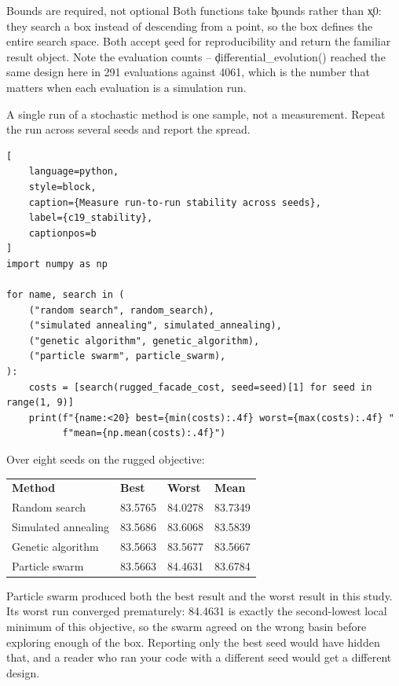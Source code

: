 \begin{SyntaxBox}{Bounds are required, not optional}
Both functions take \c{bounds} rather than \c{x0}: they search a box instead of
descending from a point, so the box defines the entire search space. Both accept
\c{seed} for reproducibility and return the familiar result object. Note the
evaluation counts -- \c{differential_evolution()} reached the same design here
in 291 evaluations against 4061, which is the number that matters when each
evaluation is a simulation run.
\end{SyntaxBox}


A single run of a stochastic method is one sample, not a measurement. Repeat the
run across several seeds and report the spread.

\begin{lstlisting}[
    language=python,
    style=block,
    caption={Measure run-to-run stability across seeds},
    label={c19_stability},
    captionpos=b
]
import numpy as np

for name, search in (
    ("random search", random_search),
    ("simulated annealing", simulated_annealing),
    ("genetic algorithm", genetic_algorithm),
    ("particle swarm", particle_swarm),
):
    costs = [search(rugged_facade_cost, seed=seed)[1] for seed in range(1, 9)]
    print(f"{name:<20} best={min(costs):.4f} worst={max(costs):.4f} "
          f"mean={np.mean(costs):.4f}")
\end{lstlisting}

Over eight seeds on the rugged objective:

\begin{center}
\begin{tabular}{llll}
\textbf{Method} & \textbf{Best} & \textbf{Worst} & \textbf{Mean} \\
Random search & 83.5765 & 84.0278 & 83.7349 \\
Simulated annealing & 83.5686 & 83.6068 & 83.5839 \\
Genetic algorithm & 83.5663 & 83.5677 & 83.5667 \\
Particle swarm & 83.5663 & 84.4631 & 83.6784 \\
\end{tabular}
\end{center}

Particle swarm produced both the best result and the worst result in this study.
Its worst run converged prematurely: 84.4631 is exactly the second-lowest local
minimum of this objective, so the swarm agreed on the wrong basin before
exploring enough of the box. Reporting only the best seed would have hidden
that, and a reader who ran your code with a different seed would get a different
design.

